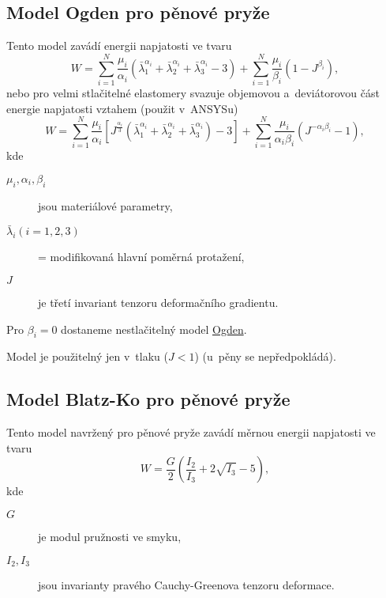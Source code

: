 
\subsection{Model Ogden pro pěnové pryže}\label{sec:ogden-foam}
Tento model zavádí energii napjatosti ve tvaru
\begin{equation}
	W
	= \sum\limits_{i=1}^N \frac{\mu_i}{\alpha_i} \left( \bar{\lambda}_1^{\alpha_i} + \bar{\lambda}_2^{\alpha_i} + \bar{\lambda}_3^{\alpha_i} - 3 \right)
	+ \sum\limits_{i=1}^N \frac{\mu_i}{\beta_i} \left(1 - J^{\beta_i}\right),
\end{equation}
nebo pro velmi stlačitelné elastomery svazuje objemovou a~deviátorovou část energie napjatosti vztahem (použit v~ANSYSu)
\begin{equation}
	W
	= \sum\limits_{i=1}^N \frac{\mu_i}{\alpha_i} \left[ J^{\frac{\alpha_i}{3}} \left( \bar{\lambda}_1^{\alpha_i} + \bar{\lambda}_2^{\alpha_i} + \bar{\lambda}_3^{\alpha_i} \right) - 3 \right]
	+ \sum\limits_{i=1}^N \frac{\mu_i}{\alpha_i \beta_i} \left(J^{-\alpha_i \beta_i} - 1\right),
\end{equation}
kde
\begin{description}
	\item[$\mu_i, \alpha_i, \beta_i$] jsou materiálové parametry,
	\item[$\bar{\lambda}_i (i=1,2,3)$] = modifikovaná hlavní poměrná protažení,
	\item[$J$] je třetí invariant tenzoru deformačního gradientu.
\end{description}

Pro $\beta_i = 0$ dostaneme nestlačitelný model \hyperref[sec:model-ogden]{Ogden}.

Model je použitelný jen v~tlaku ($J < 1$) (u~pěny se nepředpokládá).

\subsection{Model Blatz-Ko pro pěnové pryže}\label{sec:blatz-ko}
Tento model navržený pro pěnové pryže zavádí měrnou energii napjatosti ve tvaru
\begin{equation}
	W = \frac{G}{2} \left( \frac{I_2}{I_3} + 2 \sqrt{I_3} - 5 \right),
\end{equation}
kde
\begin{description}
	\item[$G$] je modul pružnosti ve smyku,
	\item[$I_2, I_3$] jsou invarianty pravého Cauchy-Greenova tenzoru deformace.
\end{description}

